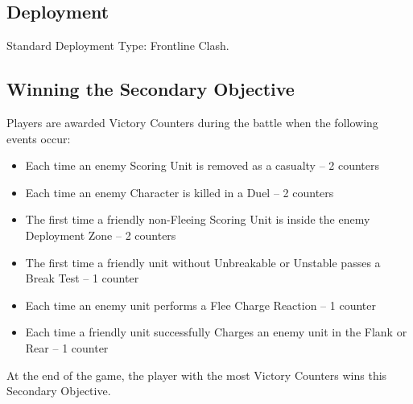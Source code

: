 
\label{EscapeFromBeyondTheVeil}


\subsection*{Deployment}

Standard Deployment Type: Frontline Clash.


\subsection*{Winning the Secondary Objective}

Players are awarded Victory Counters during the battle when the following events occur:

\begin{itemize}
\item Each time an enemy Scoring Unit is removed as a casualty -- 2 counters
\item Each time an enemy Character is killed in a Duel -- 2 counters 
\item The first time a friendly non-Fleeing Scoring Unit is inside the enemy Deployment Zone -- 2 counters
\item The first time a friendly unit without Unbreakable or Unstable passes a Break Test -- 1 counter
\item Each time an enemy unit performs a Flee Charge Reaction -- 1 counter
\item Each time a friendly unit successfully Charges an enemy unit in the Flank or Rear -- 1 counter
\end{itemize}

At the end of the game, the player with the most Victory Counters wins this Secondary Objective.
